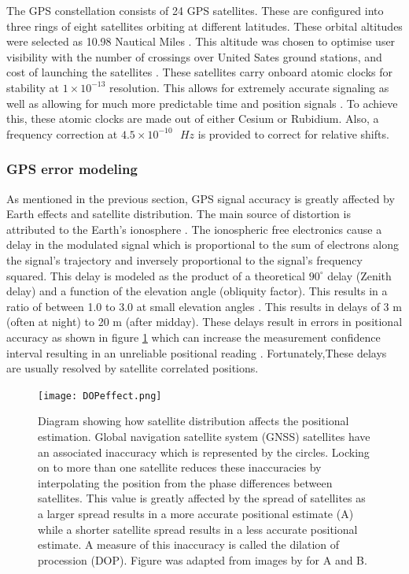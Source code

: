 The GPS constellation consists of 24 GPS satellites. These are configured into three rings of eight satellites orbiting at different latitudes. These orbital altitudes were selected as 10.98 Nautical Miles \cite{spilker1996global}. This altitude was chosen to optimise user visibility with the number of crossings over United Sates ground stations, and cost of launching the satellites \cite{spilker1996global}. These satellites carry onboard atomic clocks for stability at $1\times10^{-13}$ resolution. This allows for extremely accurate signaling as well as allowing for much more predictable time and position signals \cite{spilker1996global}. To achieve this, these atomic clocks are made out of either Cesium or Rubidium. Also, a frequency correction at $4.5\times10^{-10} \text{ } Hz$ is provided to correct for relative shifts. \par

\subsubsection{GPS error modeling}

As mentioned in the previous section, GPS signal accuracy is greatly affected by Earth effects and satellite distribution. The main source of distortion is attributed to the Earth's ionosphere \cite{spilker1996global}. The ionospheric free electronics cause a delay in the modulated signal which is proportional to the sum of electrons along the signal's trajectory and inversely proportional to the signal's frequency squared. This delay is modeled as the product of a theoretical $90^\circ$ delay (Zenith delay) and a function of the elevation angle (obliquity factor). This results in a ratio of between 1.0 to 3.0 at small elevation angles \cite{spilker1996global}. This results in delays of 3 m (often at night) to 20 m (after midday). These delays result in errors in positional accuracy as shown in figure \ref{fig:DOP_effects} which can increase the measurement confidence interval resulting in an unreliable positional reading \cite{spilker1996global}. Fortunately,These delays are usually resolved by satellite correlated positions.

\begin{figure}[H]
	\centering
	\texttt{[image: DOPeffect.png]}
	\caption{Diagram showing how satellite distribution affects the positional estimation.  Global navigation satellite system (GNSS) satellites have an associated inaccuracy which is represented by the circles. Locking on to more than one satellite reduces these inaccuracies by interpolating the position from the phase differences between satellites. This value is greatly affected by the spread of satellites as a larger spread results in a more accurate positional estimate (A) while a shorter satellite spread results in a less accurate positional estimate. A measure of this inaccuracy is called the dilation of procession (DOP). Figure was adapted from images by \cite{GISGeo2020DOP} for A and B.}
	\label{fig:DOP_effects}
\end{figure}

